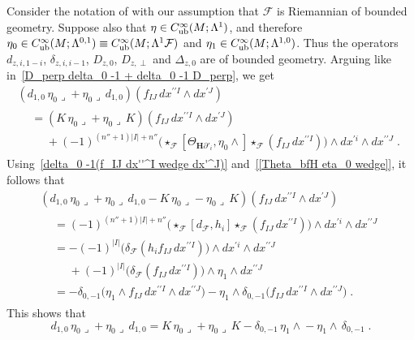 \documentclass{memo-l}
\theoremstyle{plain}
\theoremstyle{definition}
\theoremstyle{remark}
\newcommand{\FF}{\mathcal{F}}
\newcommand{\bfH}{\boldsymbol{H}}
\newcommand{\Cinftyub}{C^\infty_{\text{\rm ub}}}
\numberwithin{section}{chapter}
\numberwithin{equation}{section}%
\begin{document}
Consider the notation of  with our assumption that $\FF$ is Riemannian of bounded geometry. Suppose also that $\eta\in\Cinftyub(M;\Lambda^1)$, and therefore $\eta_0\in\Cinftyub(M;\Lambda^{0,1})\equiv \Cinftyub(M;\Lambda^1\FF)$ and $\eta_1\in\Cinftyub(M;\Lambda^{1,0})$. Thus the operators $d_{z,i,1-i}$, $\delta_{z,i,i-1}$, $D_{z,0}$, $D_{z,\perp}$ and $\Delta_{z,0}$ are of bounded geometry. Arguing like in~\eqref{D_perp delta_0 -1 + delta_0 -1 D_perp}, we get
\begin{multline*}
(d_{1,0}\,{\eta_0\lrcorner}+{\eta_0\lrcorner}\,d_{1,0})(f_{IJ}\,dx^{\prime\prime I}\wedge dx^{\prime J})\\
\begin{aligned}
&=(K\,{\eta_0\lrcorner}+{\eta_0\lrcorner}\,K)(f_{IJ}\,dx^{\prime\prime I}\wedge dx^{\prime J})\\
&\phantom{={}}{}+(-1)^{(n''+1)|I|+n''}\big(\star_\FF[\Theta_{\bfH\partial'_i},{\eta_0\wedge}]\star_\FF(f_{IJ}\,dx^{\prime\prime I})\big)
\wedge dx^{\prime i}\wedge dx^{\prime\prime J}\;.
\end{aligned}
\end{multline*}
Using~\eqref{delta_0 -1(f_IJ dx''^I wedge dx'^J)} and~\eqref{[Theta_bfH eta_0 wedge]}, it follows that
\begin{multline*}
(d_{1,0}\,{\eta_0\lrcorner}+{\eta_0\lrcorner}\,d_{1,0}-K\,{\eta_0\lrcorner}-{\eta_0\lrcorner}\,K)
(f_{IJ}\,dx^{\prime\prime I}\wedge dx^{\prime J})\\
\begin{aligned}
&=(-1)^{(n''+1)|I|+n''}\big(\star_\FF[d_\FF,h_i]\star_\FF(f_{IJ}\,dx^{\prime\prime I})\big)
\wedge dx^{\prime i}\wedge dx^{\prime\prime J}\\
&=-(-1)^{|I|}\big(\delta_\FF(h_if_{IJ}\,dx^{\prime\prime I})\big)
\wedge dx^{\prime i}\wedge dx^{\prime\prime J}\\
&\phantom{={}}{}+(-1)^{|I|}\big(\delta_\FF(f_{IJ}\,dx^{\prime\prime I})\big)
\wedge \eta_1\wedge dx^{\prime\prime J}\\
&=-\delta_{0,-1}\big(\eta_1\wedge f_{IJ}\,dx^{\prime\prime I}\wedge dx^{\prime\prime J}\big)
-\eta_1\wedge\delta_{0,-1}\big(f_{IJ}\,dx^{\prime\prime I}\wedge dx^{\prime\prime J}\big)\;.
\end{aligned}
\end{multline*}
This shows that
\begin{equation}\label{d_1,0 eta_0 lrcorner + eta_0 lrcorner d_1 0}
d_{1,0}\,{\eta_0\lrcorner}+{\eta_0\lrcorner}\,d_{1,0}=K\,{\eta_0\lrcorner}+{\eta_0\lrcorner}\,K
-\delta_{0,-1}\,{\eta_1\wedge}-{\eta_1\wedge}\,\delta_{0,-1}\;.
\end{equation}
\end{document}
